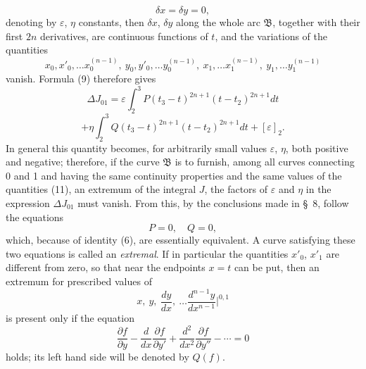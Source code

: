 \documentclass[11pt,a4paper,leqno]{article}
\begin{document}
\[
\delta x=\delta y=0,
\]
denoting by $\varepsilon$, $\eta$ constants, then $\delta x$, $\delta y$ along the whole arc $\mathfrak B$, together with their first $2n$ derivatives, are continuous functions of $t$, and the variations of the quantities
\begin{equation}\tag{11}
 x_0,x'_0,\ldots x_0^{(n-1)},\ y_0,y'_0,\ldots y_0^{(n-1)},\ x_1,\ldots x_1^{(n-1)},\ y_1,\ldots y_1^{(n-1)}
\end{equation}
vanish. Formula (9) therefore gives
\[
\Delta J_{01}=\varepsilon\int_2^3P(t_3-t)^{2n+1}(t-t_2)^{2n+1}dt
\]
\[
+\eta\int_2^3Q(t_3-t)^{2n+1}(t-t_2)^{2n+1}dt+[\varepsilon]_2.
\]
In general this quantity becomes, for arbitrarily small values $\varepsilon$, $\eta$, both positive and negative; therefore, if the curve $\mathfrak B$ is to furnish, among all curves connecting 0 and 1 and having the same continuity properties and the same values of the quantities (11), an extremum of the integral $J$, the factors of $\varepsilon$ and $\eta$ in the expression $\Delta J_{01}$ must vanish. From this, by the conclusions made in \S~8, follow the equations
\[
P=0,\quad Q=0,
\]
which, because of identity (6), are essentially equivalent. A curve satisfying these two equations is called an \emph{extremal}. If in particular the quantities $x'_0$, $x'_1$ are different from zero, so that near the endpoints $x=t$ can be put, then an extremum for prescribed values of
\[
x,\ y,\ \frac{dy}{dx},\ \ldots \frac{d^{n-1}y}{dx^{n-1}}\bigg|^{0,1}
\]
is present only if the equation
\[
\frac{\partial f}{\partial y}-\frac{d}{dx}\frac{\partial f}{\partial y'}+\frac{d^2}{dx^2}\frac{\partial f}{\partial y''}-\cdots=0
\]
holds; its left hand side will be denoted by $Q(f)$.
\end{document}
